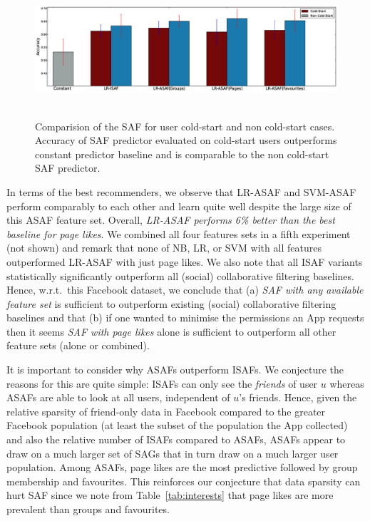 \begin{figure}[tbh!]
\centering
\includegraphics[width=180mm,height=50mm]{data/plots/new/cold_start.eps}
\vspace{-3mm}
\caption{Comparision of the SAF for user cold-start and non cold-start cases. Accuracy of SAF predictor evaluated on
cold-start users outperforms constant predictor baseline and is
comparable to the non cold-start SAF predictor.}
\label{fig:coldstart}
\end{figure}
 

In terms of the best recommenders, we observe that LR-ASAF and
SVM-ASAF perform comparably to each other and learn quite well despite
the large size of this ASAF feature set.  Overall, \emph{LR-ASAF
  performs 6\% better than the best baseline for page likes}.  We
combined all four features sets in a fifth experiment (not shown) and
remark that none of NB, LR, or SVM with all features outperformed
LR-ASAF with just page likes.  We also note that all ISAF variants
statistically significantly outperform all (social) collaborative
filtering baselines.  Hence, w.r.t.\ this Facebook dataset, we
conclude that (a) \emph{SAF with any available feature set} is sufficient
to outperform existing (social) collaborative filtering baselines and
that (b) if one wanted to minimise the permissions an App requests
then it seems \emph{SAF with page likes} alone is sufficient to
outperform all other feature sets (alone or combined).

It is important to consider why ASAFs outperform ISAFs.  We conjecture
the reasons for this are quite simple: ISAFs can only see the
\emph{friends} of user $u$ whereas ASAFs are able to look at all
users, independent of $u$'s friends.  Hence, given the relative
sparsity of friend-only data in Facebook compared to the greater
Facebook population (at least the subset of the population the App
collected) and also the relative number of ISAFs compared to ASAFs,
ASAFs appear to draw on a much larger set of SAGs that in turn draw on
a much larger user population.  Among ASAFs, page likes are the most
predictive followed by group membership and favourites.  This
reinforces our conjecture that data sparsity can hurt SAF since we
note from Table~\ref{tab:interests} that page likes are more prevalent
than groups and favourites.


